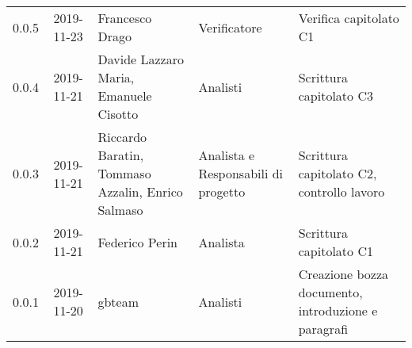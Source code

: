 {\begin{longtable}{ c c  C{4cm}  C{3cm} C{4cm}}
0.0.5 & 2019-11-23 & Francesco Drago & Verificatore & Verifica capitolato C1 \\

0.0.4 & 2019-11-21 & Davide Lazzaro Maria, Emanuele Cisotto & Analisti & Scrittura capitolato C3 \\

0.0.3 & 2019-11-21 & Riccardo Baratin, Tommaso Azzalin, Enrico Salmaso & Analista e Responsabili di progetto & Scrittura capitolato C2, controllo lavoro  \\

0.0.2 & 2019-11-21 & Federico Perin & Analista & Scrittura capitolato C1  \\
		
0.0.1 & 2019-11-20 & gbteam & Analisti & Creazione bozza documento, introduzione e paragrafi \\
		
\end{longtable}
}
